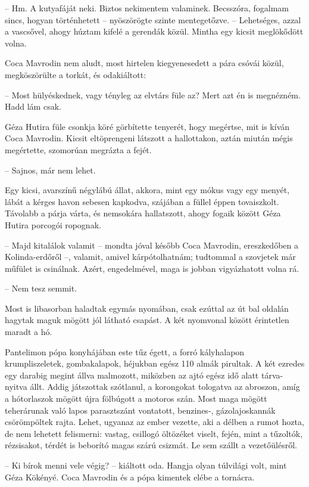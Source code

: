 \documentclass{IEEEtran}
\begin{document}
– Hm. A kutyafáját neki. Biztos nekimentem valaminek. Becsszóra, fogalmam
sincs, hogyan történhetett – nyöszörögte szinte mentegetőzve. – Lehetséges,
azzal a vascsővel, ahogy húztam kifelé a gerendák közül. Mintha egy kicsit
meglökődött volna.

Coca Mavrodin nem aludt, most hirtelen kiegyenesedett a pára csóvái közül,
megköszörülte a torkát, és odakiáltott:

– Most hülyéskednek, vagy tényleg az elvtárs füle az? Mert azt én is
megnézném. Hadd lám csak.

Géza Hutira füle csonkja köré görbítette tenyerét, hogy megértse, mit is kíván
Coca Mavrodin. Kicsit eltöprengeni látszott a hallottakon, aztán miután mégis
megértette, szomorúan megrázta a fejét.

– Sajnos, már nem lehet.

Egy kicsi, avarszínű négylábú állat, akkora, mint egy mókus vagy egy menyét,
lábát a kérges havon sebesen kapkodva, szájában a füllel éppen tovaiszkolt.
Távolabb a párja várta, és nemsokára hallatszott, ahogy fogaik között Géza
Hutira porcogói ropognak.

– Majd kitalálok valamit – mondta jóval később Coca Mavrodin, ereszkedőben a
Kolinda-erdőről –, valamit, amivel kárpótolhatnám; tudtommal a szovjetek már
műfület is csinálnak. Azért, engedelmével, maga is jobban vigyázhatott volna
rá.

– Nem tesz semmit.

Most is libasorban haladtak egymás nyomában, csak ezúttal az út bal oldalán
hagytak maguk mögött jól látható csapást. A két nyomvonal között érintetlen
maradt a hó.

Pantelimon pópa konyhájában este tűz égett, a forró kályhalapon
krumpliszeletek, gombakalapok, héjukban egész 110 almák pirultak. A két ezredes
egy darabig megint állva malmozott, miközben az ajtó egész idő alatt
tárva-nyitva állt. Addig játszottak szótlanul, a korongokat tologatva az
abroszon, amíg a hótorlaszok mögött újra fölbúgott a motoros szán. Most maga
mögött teherárunak való lapos parasztszánt vontatott, benzines-,
gázolajoskannák csörömpöltek rajta. Lehet, ugyanaz az ember vezette, aki a
délben a rumot hozta, de nem lehetett felismerni: vastag, csillogó öltözéket
viselt, fején, mint a tűzoltók, rézsisakot, térdét is beborító magas szárú
csizmát. Le sem szállt a vezetőülésről.

– Ki bírok menni vele végig? – kiáltott oda. Hangja olyan túlvilági volt, mint
Géza Kökényé. Coca Mavrodin és a pópa kimentek elébe a tornácra.
\end{document}

